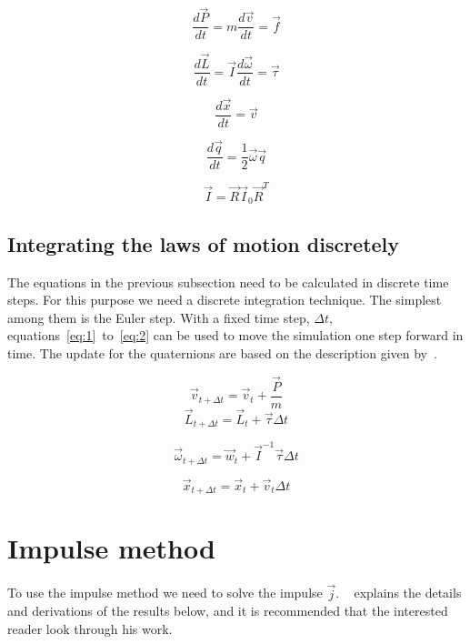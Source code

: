 \begin{equation}
  \frac{d\vec{P}}{dt}=m\frac{d\vec{v}}{dt} = \vec{f}
\end{equation}

\begin{equation}
  \frac{d\vec{L}}{dt}=\vec{I}\frac{d\vec{\omega}}{dt} = \vec{\tau}
\end{equation}

\begin{equation}
  \frac{d\vec{x}}{dt}=\vec{v}
\end{equation}

\begin{equation}
  \frac{d\vec{q}}{dt} = \frac{1}{2}\vec{\omega}\vec{q}
\end{equation}

\begin{equation}
  \vec{I} = \vec{R}\vec{I}_0\vec{R}^T
\end{equation}

\subsection{Integrating the laws of motion discretely}
The equations in the previous subsection need to be calculated in discrete time steps.
For this purpose we need a discrete integration technique. The
simplest among them is the Euler step. With a fixed time step, $\Delta t$,
equations~\ref{eq:1}~to~\ref{eq:2} can be used to move the simulation one step forward in time.
The update for the quaternions are based on the description given by~\cite{fossum}.

\begin{equation}\label{eq:1}
  \vec{v}_{t + \Delta t} = \vec{v}_{t}+\frac{\vec{P}}{m}
\end{equation}
\begin{equation}
  \vec{L}_{t + \Delta t} = \vec{L}_{t}+\vec{\tau}\Delta t
\end{equation}

\begin{equation}
  \vec{\omega}_{t + \Delta t} = \vec{w}_t+\vec{I}^{-1}\vec{\tau}\Delta t
\end{equation}

\begin{equation}\label{eq:2}
  \vec{x}_{t + \Delta t} = \vec{x}_{t} + \vec{v}_t\Delta t
\end{equation}

\section{Impulse method}\label{sec:imp}
To use the impulse method we need to solve the impulse $\vec{j}$. ~\cite{baraff} explains the details
and derivations of the results below, and it is recommended that the interested reader look through
his work.

